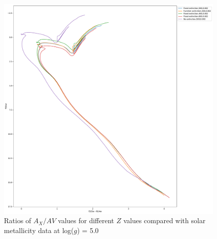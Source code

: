 \documentclass[a4paper, 11pt, oneside]{LJMU_Astro_Thesis}  %
\begin{document}
\begin{figure}[h]
\begin{center}
\includegraphics[scale=0.3]{../basti_isochrones_10_13Gyr/Extinction_T50k_FeH0fix_func_f555w_f555wmf814w_500_400_600_Myr_FeH_0p002_ref_noext_Av_1p0.pdf}
\caption{Ratios of $A_{X}/A{V}$ values for different $Z$ values compared with solar metallicity data at log($g$) = 5.0}
\label{wfc3_isoc1_T50k}
\end{center}
\end{figure}
\end{document}
